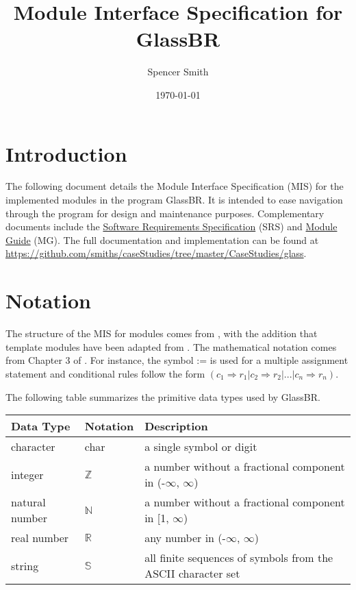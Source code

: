 \documentclass[12pt, titlepage]{article}
\newcommand{\progname}{GlassBR}
\begin{document}
\title{Module Interface Specification for \progname} 
\author{Spencer Smith}
\date{\today}

\maketitle

\tableofcontents

\newpage

\section{Introduction}

The following document details the Module Interface Specification (MIS) for the
implemented modules in the program \progname{}. It is intended to ease navigation
through the program for design and maintenance purposes.  Complementary
documents include the \href{../SRS/glassbr_srs.pdf}{Software Requirements
  Specification} (SRS) and \href{../MG/glassbr_mg.pdf}{Module Guide} (MG).  The
full documentation and implementation can be found at
\url{https://github.com/smiths/caseStudies/tree/master/CaseStudies/glass}.

\section{Notation}

The structure of the MIS for modules comes from \citet{HoffmanAndStrooper1995},
with the addition that template modules have been adapted from
\cite{GhezziEtAl2003}.  The mathematical notation comes from Chapter 3 of
\citet{HoffmanAndStrooper1995}.  For instance, the symbol := is used for a
multiple assignment statement and conditional rules follow the form $(c_1
\Rightarrow r_1 | c_2 \Rightarrow r_2 | ... | c_n \Rightarrow r_n )$.

The following table summarizes the primitive data types used by \progname. 

\begin{center}
\renewcommand{\arraystretch}{1.2}
\noindent 
\begin{tabular}{l l p{7.5cm}} 
\toprule 
\textbf{Data Type} & \textbf{Notation} & \textbf{Description}\\ 
\midrule
character & char & a single symbol or digit\\
integer & $\mathbb{Z}$ & a number without a fractional component in (-$\infty$, $\infty$) \\
natural number & $\mathbb{N}$ & a number without a fractional component in [1, $\infty$) \\
real number & $\mathbb{R}$ & any number in (-$\infty$, $\infty$)\\
string & $\mathbb{S}$ & all finite sequences of symbols from the ASCII character set\\
\bottomrule
\end{tabular} 
\end{center}
\end{document}
